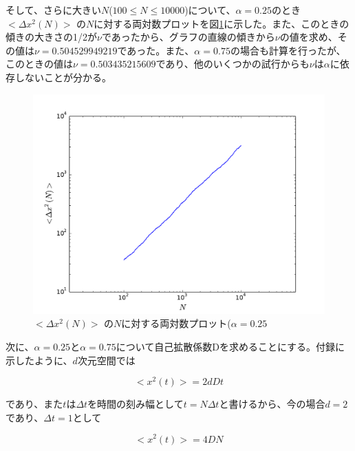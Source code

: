 \documentclass{jsarticle}
\begin{document}
\begin{enumerate}
\begin{enumerate}
                    そして、さらに大きい$N$($100 \le N \le 10000$)について、$\alpha =0.25$のとき$<\Delta x^{2}(N)>$ の$N$に対する両対数プロットを図\ref{fig:4}に示した。また、このときの傾きの大きさの1/2が$\nu$であったから、グラフの直線の傾きから$\nu$の値を求め、その値は$\nu = 0.504529949219$であった。また、$\alpha=0.75$の場合も計算を行ったが、このときの値は$\nu=0.503435215609$であり、他のいくつかの試行からも$\nu$は$\alpha$に依存しないことが分かる。
                
                    \begin{figure}[H]
                        \begin{center}
                            \includegraphics[width=12.5cm]{figure_4.pdf}
                            \caption{$<\Delta x^{2}(N)>$ の$N$に対する両対数プロット($\alpha =0.25$}
                            \label{fig:4}
                        \end{center}
                    \end{figure}
                 
                 次に、$\alpha =0.25$と$\alpha=0.75$について自己拡散係数Dを求めることにする。付録に示したように、$d$次元空間では
                 
                 \begin{equation}
                     <x^{2}(t)> = 2dDt
                 \end{equation}


                であり、また$t$は$\Delta t$を時間の刻み幅として$t=N \Delta t$と書けるから、今の場合$d = 2$であり、$\Delta t=1$として

                \begin{equation}
                    <x^{2}(t)> = 4DN
                \end{equation}


\end{enumerate}
\end{enumerate}
\end{document}
